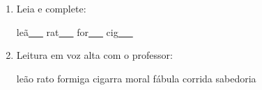 \begin{exercicio}
\begin{enumerate}[resume]
\begin{enumerate}[label=(\alph*)]
    \item O som da unidade é: ( ) oral ( ) nasal 

    \item A primeira sílaba de LEÃO é: ( ) LE ( ) ÃO

    \item As palavras da unidade aparecem: ( ) no início ( ) no meio ( ) no fim das palavras

  \end{enumerate}

  \item Leia e complete:
  \begin{center}
  leã\underline{~~~} \quad rat\underline{~~~} \quad for\underline{~~~} \quad cig\underline{~~~}
  \end{center}

  \item Leitura em voz alta com o professor:
  \begin{center}
  leão \quad rato \quad formiga \quad cigarra \quad moral \quad fábula \quad corrida \quad sabedoria
  \end{center}

\end{enumerate}

\end{exercicio}



